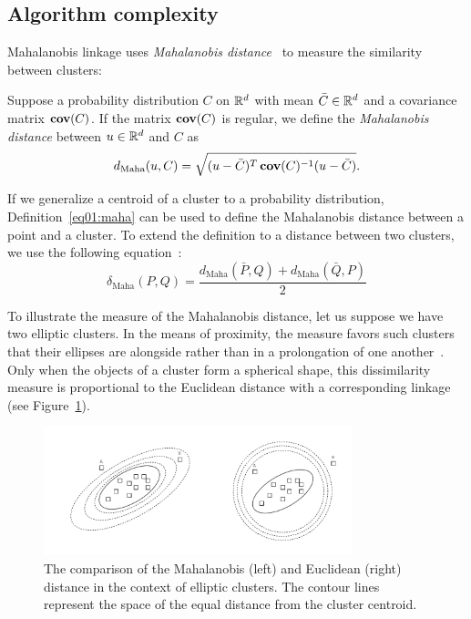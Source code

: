 \subsection{Algorithm complexity}

Mahalanobis linkage uses \emph{Mahalanobis distance}~\cite{mahalanobis1936generalized} to measure the similarity between clusters:
\begin{defn}
    Suppose a probability distribution $C$ on $\mathbb{R}^d$ with mean $\bar{C} \in \mathbb{R}^d$ and a covariance matrix $\operatorname{\textbf{cov}}(C)$. If the matrix $\operatorname{\textbf{cov}}(C)$ is regular, we define the \emph{Mahalanobis distance} between $u \in \mathbb{R}^d$ and $C$ as
    \begin{equation}
    d_\text{Maha}(u,C) = \sqrt{(u-\bar{C})^T\operatorname{\textbf{cov}}(C)^{-1}(u-\bar{C})}.
    \end{equation}\label{eq01:maha}
\end{defn}

If we generalize a centroid of a cluster to a probability distribution, Definition~\ref{eq01:maha} can be used to define the Mahalanobis distance between a point and a cluster. To extend the definition to a distance between two clusters, we use the following equation~\cite{fivser2012detection}:
\begin{equation}
    \delta_\text{Maha}(P,Q) = \frac{d_\text{Maha}(\bar{P},Q) + d_\text{Maha}(\bar{Q},P)}{2}
\end{equation}\label{eq01:maha_linkage}

To illustrate the measure of the Mahalanobis distance, let us suppose we have two elliptic clusters. In the means of proximity, the measure favors such clusters that their ellipses are alongside rather than in a prolongation of one another~\cite{dagnelie1991using}.
Only when the objects of a cluster form a spherical shape, this dissimilarity measure is proportional to the Euclidean distance with a corresponding linkage (see Figure~\ref{fig:ellipses}).

\begin{figure}[h]
    \centering
    \includegraphics[width=0.8\textwidth]{img/maha.drawio.pdf}
    \caption{The comparison of the Mahalanobis (left) and Euclidean (right) distance in the context of elliptic clusters. The contour lines represent the space of the equal distance from the cluster centroid.}
    \label{fig:ellipses}
\end{figure}

